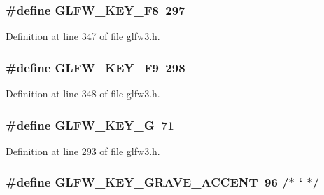 \subsubsection[{G\+L\+F\+W\+\_\+\+K\+E\+Y\+\_\+\+F8}]{\setlength{\rightskip}{0pt plus 5cm}\#define G\+L\+F\+W\+\_\+\+K\+E\+Y\+\_\+\+F8~297}\label{group__keys_gac9d39390336ae14e4a93e295de43c7e8}


Definition at line 347 of file glfw3.\+h.

\hypertarget{group__keys_gae40de0de1c9f21cd26c9afa3d7050851}{}
\subsubsection[{G\+L\+F\+W\+\_\+\+K\+E\+Y\+\_\+\+F9}]{\setlength{\rightskip}{0pt plus 5cm}\#define G\+L\+F\+W\+\_\+\+K\+E\+Y\+\_\+\+F9~298}\label{group__keys_gae40de0de1c9f21cd26c9afa3d7050851}


Definition at line 348 of file glfw3.\+h.

\hypertarget{group__keys_gae74ecddf7cc96104ab23989b1cdab536}{}
\subsubsection[{G\+L\+F\+W\+\_\+\+K\+E\+Y\+\_\+\+G}]{\setlength{\rightskip}{0pt plus 5cm}\#define G\+L\+F\+W\+\_\+\+K\+E\+Y\+\_\+\+G~71}\label{group__keys_gae74ecddf7cc96104ab23989b1cdab536}


Definition at line 293 of file glfw3.\+h.

\hypertarget{group__keys_ga7a3701fb4e2a0b136ff4b568c3c8d668}{}
\subsubsection[{G\+L\+F\+W\+\_\+\+K\+E\+Y\+\_\+\+G\+R\+A\+V\+E\+\_\+\+A\+C\+C\+E\+N\+T}]{\setlength{\rightskip}{0pt plus 5cm}\#define G\+L\+F\+W\+\_\+\+K\+E\+Y\+\_\+\+G\+R\+A\+V\+E\+\_\+\+A\+C\+C\+E\+N\+T~96  /$\ast$ ` $\ast$/}\label{group__keys_ga7a3701fb4e2a0b136ff4b568c3c8d668}


